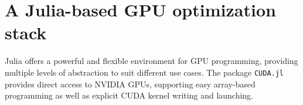 




\section{A Julia-based GPU optimization stack}
Julia offers a powerful and flexible environment for GPU programming, providing multiple levels of abstraction to suit different use cases.
The package \texttt{CUDA.jl}~\cite{besard2018juliagpu,besard2019prototyping} provides direct access to NVIDIA GPUs, supporting easy array-based programming as well as explicit CUDA kernel writing and launching.

